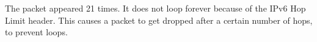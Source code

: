 The packet appeared 21 times.  It does not loop forever because of the IPv6 Hop Limit header. This causes a packet to get dropped after a certain number of hops, to prevent loops.